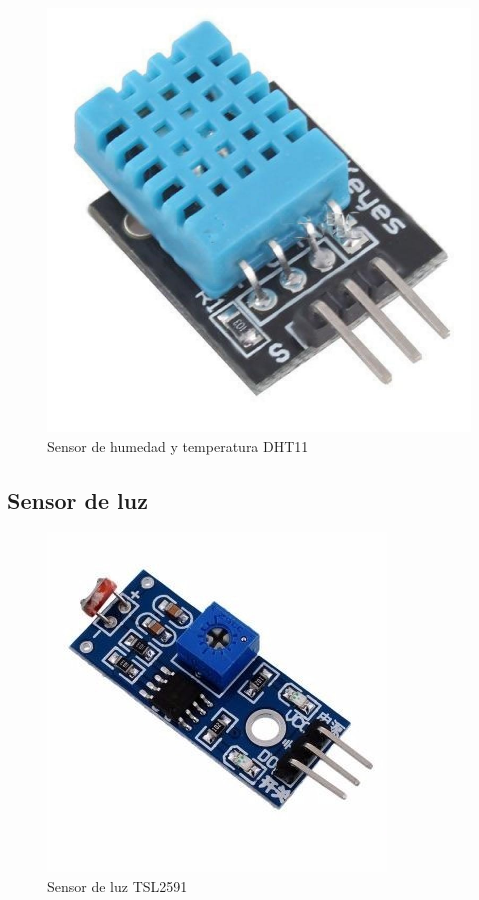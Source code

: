 \documentclass[12pt]{article}
\begin{document}
\begin{figure}[H]
	\centering
	\includegraphics[scale=.12]{dht11}
	\caption{Sensor de humedad y temperatura DHT11}
	\label{fig:DHT11}
\end{figure}

\subsection{Sensor de luz}

\begin{figure}[H]
	\centering
	\includegraphics[scale=.45]{Luz}
	\caption{Sensor de luz TSL2591}
	\label{fig:luz}
\end{figure}
\end{document}
